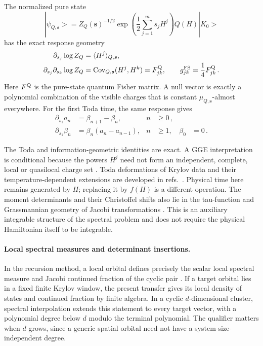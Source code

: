 \documentclass[a4paper,11pt]{article}
\def\ket#1{|#1>}%
\theoremstyle{definition}
\theoremstyle{remark}
\newcommand{\ket}[1]{|#1\rangle}
\begin{document}
The normalized pure state
\begin{equation}
   \ket{\psi_{Q,\boldsymbol s}}
   =Z_Q(\boldsymbol s)^{-1/2}
     \exp\!\left(\frac12\sum_{j=1}^{m}s_jH^j\right)Q(H)\ket{K_0}
   \label{eq:toda-times-deformation}
\end{equation}
has the exact response geometry
\begin{equation}
\begin{aligned}
   \partial_{s_j}\log Z_Q&=\langle H^j\rangle_{Q,\boldsymbol s},\\
   \partial_{s_j}\partial_{s_k}\log Z_Q
   &=\operatorname{Cov}_{Q,\boldsymbol s}(H^j,H^k)
    =F^{\rm Q}_{jk},
   \qquad
   g^{\rm FS}_{jk}=\frac14F^{\rm Q}_{jk}\,.
\end{aligned}
   \label{eq:toda-response-generator}
\end{equation}
Here $F^{\rm Q}$ is the pure-state quantum Fisher matrix.  A null vector is exactly a polynomial
combination of the visible charges that is
constant
$\mu_{Q,\boldsymbol s}$-almost everywhere.  For the first
Toda time, the same response gives
\begin{equation}
\begin{aligned}
   \partial_{s_1}a_n&=\beta_{n+1}-\beta_n,
      & n&\ge0\,,\\
   \partial_{s_1}\beta_n&=\beta_n(a_n-a_{n-1}),
      & n&\ge1,
      & \beta_0&=0\,.
\end{aligned}
   \label{eq:toda-first-flow-jacobi}
\end{equation}

The Toda and information-geometric identities are exact.  A GGE interpretation is conditional
because the powers $H^j$ need not form an independent, complete, local or quasilocal charge set
\cite{RigolDunjkoYurovskyOlshanii2007}.  Toda deformations of Krylov data and their
temperature-dependent extensions are developed in
refs.~\cite{DymarskyGorsky2020,TakahashiNandyDelCampo2026,AngelinosChakrabortyDymarsky2026}.
Physical time here remains generated by $H$; replacing it by $f(H)$ is a different operation.
The moment determinants and their Christoffel shifts also lie in the tau-function and Grassmannian
geometry of Jacobi transformations \cite{SegalWilson1985,AdlerVanMoerbeke1997,AdlerVanMoerbeke2000}.
This is an auxiliary integrable structure of the spectral problem and does not require the
physical Hamiltonian itself to be integrable.

\paragraph{Local spectral measures and determinant insertions.}
In the recursion method, a local orbital defines precisely the scalar local spectral measure and
Jacobi continued fraction of the cyclic pair \cite{HaydockHeineKelly1972}.
If a target orbital lies in a fixed finite Krylov window, the present transfer gives its local
density of states and continued fraction by finite algebra.  In a cyclic $d$-dimensional cluster,
spectral interpolation extends this statement to every target vector, with a polynomial degree
below $d$ modulo the terminal polynomial.  The qualifier matters when $d$ grows, since a generic
spatial orbital need not have a system-size-independent degree.
\end{document}
